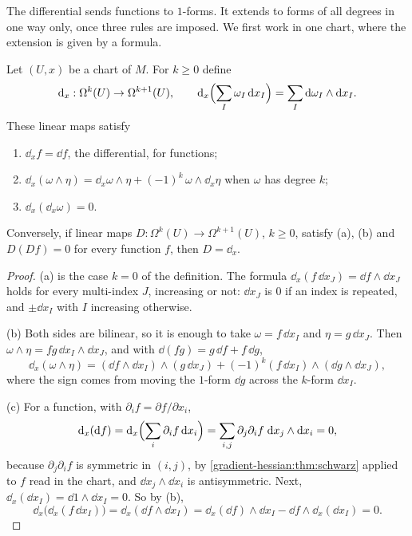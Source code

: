 \begin{notechapter}
The differential sends functions to $1$-forms. It extends to forms of
all degrees in one way only, once three rules are imposed. We first work
in one chart, where the extension is given by a formula.

\begin{lemma}\label{differential-forms:lem:chart}
Let $(U, x)$ be a chart of $M$. For $k\geq0$ define
\begin{equation}\label{differential-forms:eq:d}
  \mathrm{d}_x:\Omega^k(U)\to\Omega^{k+1}(U) ,
  \qquad
  \mathrm{d}_x\Bigl(\sum_I\omega_I\,\mathrm{d} x_I\Bigr)
  = \sum_I\mathrm{d}\omega_I\wedge\mathrm{d} x_I .
\end{equation}
These linear maps satisfy
\begin{enumerate}[nosep,label=(\alph*)]
  \item $\dd_xf = \dd f$, the differential, for functions;
  \item $\dd_x(\omega\wedge\eta)
        = \dd_x\omega\wedge\eta + (-1)^k\,\omega\wedge\dd_x\eta$ when
        $\omega$ has degree $k$;
  \item $\dd_x(\dd_x\omega) = 0$.
\end{enumerate}
Conversely, if linear maps $D:\Omega^k(U)\to\Omega^{k+1}(U)$, $k\geq0$,
satisfy \textup{(a)}, \textup{(b)} and $D(Df) = 0$ for every function
$f$, then $D = \dd_x$.
\end{lemma}

\begin{proof}
(a) is the case $k = 0$ of the definition. The formula
$\dd_x(f\,\dd x_J) = \dd f\wedge\dd x_J$ holds for every multi-index
$J$, increasing or not: $\dd x_J$ is $0$ if an index is repeated, and
$\pm\dd x_I$ with $I$ increasing otherwise.

(b) Both sides are bilinear, so it is enough to take
$\omega = f\,\dd x_I$ and $\eta = g\,\dd x_J$. Then
$\omega\wedge\eta = fg\,\dd x_I\wedge\dd x_J$, and with
$\dd(fg) = g\,\dd f + f\,\dd g$,
\[
  \dd_x(\omega\wedge\eta)
  = (\dd f\wedge\dd x_I)\wedge(g\,\dd x_J)
  + (-1)^k(f\,\dd x_I)\wedge(\dd g\wedge\dd x_J) ,
\]
where the sign comes from moving the $1$-form $\dd g$ across the
$k$-form $\dd x_I$.

(c) For a function, with $\partial_if = \partial f/\partial x_i$,
\[
  \mathrm{d}_x(\mathrm{d} f) = \mathrm{d}_x\Bigl(\sum_i\partial_if\,\mathrm{d} x_i\Bigr)
  = \sum_{i,j}\partial_j\partial_if\;\mathrm{d} x_j\wedge\mathrm{d} x_i = 0 ,
\]
because $\partial_j\partial_if$ is symmetric in $(i, j)$, by
\cref{gradient-hessian:thm:schwarz} applied to $f$ read in the chart,
and $\dd x_j\wedge\dd x_i$ is antisymmetric. Next,
$\dd_x(\dd x_I) = \dd1\wedge\dd x_I = 0$. So by (b),
\[
  \dd_x\bigl(\dd_x(f\,\dd x_I)\bigr) = \dd_x(\dd f\wedge\dd x_I)
  = \dd_x(\dd f)\wedge\dd x_I - \dd f\wedge\dd_x(\dd x_I) = 0 .
\]


\end{proof}
\end{notechapter}
